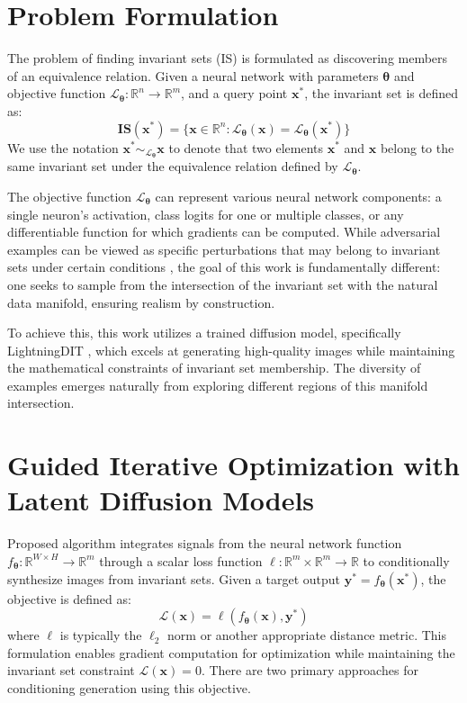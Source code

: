 \documentclass[licencjacka,en]{pracamgr}
\begin{document}
\section{Problem Formulation}
The problem of finding invariant sets (IS) is formulated as discovering members of an equivalence relation. Given a neural network with parameters $\boldsymbol{\theta}$ and objective function $\mathcal{L}_{\boldsymbol{\theta}}:\mathbb{R}^n \rightarrow \mathbb{R}^m$, and a query point $\mathbf{x^*}$, the invariant set is defined as:
\begin{equation}
  \mathbf{IS}(\mathbf{x^*}) = \{ \mathbf{x} \in \mathbb{R}^n : \mathcal{L}_{\boldsymbol{\theta}}(\mathbf{x}) = \mathcal{L}_{\boldsymbol{\theta}}(\mathbf{x^*}) \}
  \label{eq:is}
\end{equation}
We use the notation $\mathbf{x^*} \sim_{\mathcal{L}_{\boldsymbol{\theta}}} \mathbf{x}$ to denote that two elements $\mathbf{x^*}$ and $\mathbf{x}$ belong to the same invariant set under the equivalence relation defined by $\mathcal{L}_{\boldsymbol{\theta}}$.

The objective function $\mathcal{L}_{\boldsymbol{\theta}}$ can represent various neural network components: a single neuron's activation, class logits for one or multiple classes, or any differentiable function for which gradients can be computed. While adversarial examples can be viewed as specific perturbations that may belong to invariant sets under certain conditions \citep{szegedy2014intriguingpropertiesneuralnetworks}, the goal of this work is fundamentally different: one seeks to sample from the intersection of the invariant set with the natural data manifold, ensuring realism by construction.

To achieve this, this work utilizes a trained diffusion model, specifically LightningDIT \citep{yao2025vavae} \citep{yao2024fasterdit}, which excels at generating high-quality images while maintaining the mathematical constraints of invariant set membership. The diversity of examples emerges naturally from exploring different regions of this manifold intersection.


\section{Guided Iterative Optimization with Latent Diffusion Models}

Proposed algorithm integrates signals from the neural network function $f_{\boldsymbol{\theta}}:\mathbb{R}^{W \times H} \rightarrow \mathbb{R}^m$ through a scalar loss function $\ell: \mathbb{R}^m \times \mathbb{R}^m \rightarrow \mathbb{R}$ to conditionally synthesize images from invariant sets. Given a target output $\mathbf{y^*} = f_{\boldsymbol{\theta}}(\mathbf{x^*})$, the objective is defined as:
\begin{equation}
\mathcal{L}(\mathbf{x}) = \ell(f_{\boldsymbol{\theta}}(\mathbf{x}), \mathbf{y^*})
\end{equation}
where $\ell$ is typically the $\ell_2$ norm or another appropriate distance metric. This formulation enables gradient computation for optimization while maintaining the invariant set constraint $\mathcal{L}(\mathbf{x}) = 0$. There are two primary approaches for conditioning generation using this objective.
\end{document}

